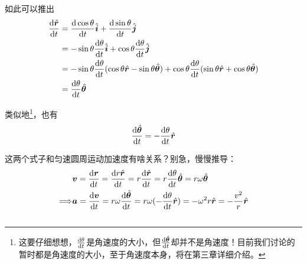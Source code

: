  如此可以推出
 \begin{equation}
  \begin{aligned}
      \frac{\dif \hat{\vec{r}}}{\dif t}&=\frac{\dif \cos\theta}{\dif t}\hat{\vec{i}}+\frac{\dif \sin\theta}{\dif t}\hat{\vec{j}}\\
         &=-\sin\theta\frac{\dif \theta}{\dif t}\hat{\vec{i}}+\cos\theta\frac{\dif \theta}{\dif t}\hat{\vec{j}}\\
&=-\sin\theta\frac{\dif \theta}{\dif t}(\cos\theta\hat{\vec{r}}-\sin\theta\hat{\vec{\theta}})+\cos\theta\frac{\dif \theta}{\dif t}(\sin\theta\hat{\vec{r}}+\cos\theta\hat{\vec{\theta}})\\
&=\frac{\dif \theta}{\dif t}\hat{\vec{\theta}}
  \end{aligned}
  \nonumber
\end{equation}

类似地\footnote{这要仔细想想，$\frac{\dif \theta}{\dif t}$是角速度的大小，但$\frac{\dif \hat{\vec{\theta}}}{\dif t}$却并不是角速度！目前我们讨论的暂时都是角速度的大小，至于角速度本身，将在第三章详细介绍。}，也有
\[\displaystyle\frac{\dif \hat{\vec{\theta}}}{\dif t}=-\frac{\dif \theta}{\dif t}\hat{\vec{r}}\]

这两个式子和匀速圆周运动加速度有啥关系？别急，慢慢推导：
\begin{equation}
  \begin{aligned}
    &\vec{v}=\frac{\dif \vec{r}}{\dif t}=\frac{\dif {r\hat{\vec{r}}}}{\dif t}=r\frac{\dif \hat{\vec{r}}}{\dif t}=r\frac{\dif \theta}{\dif t}\hat{\vec{\theta}}=r\omega \hat{\vec{\theta}}\\
\Longrightarrow &\vec{a}=\frac{\dif \vec{v}}{\dif t}=r\omega\frac{\dif \hat{\vec{\theta}}}{\dif t}=r\omega(-\frac{\dif \theta}{\dif t}\hat{\vec{r}} )=-\omega^{2}r\hat{\vec{r}}=-\frac{v^{2}}{r}\hat{\vec{r}}
  \end{aligned}
  \nonumber
\end{equation}

\subsection[变速圆周运动]{}
\begin{center}
\end{center}


